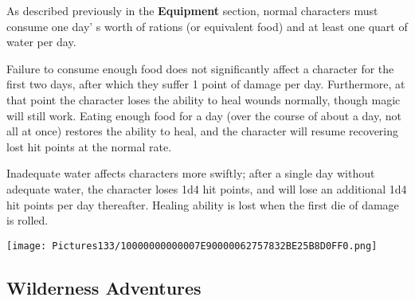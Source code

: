 \documentclass[a4paper,twoside,openany,10pt]{book}
\begin{document}
\begin{multicols}{2}
As described previously in the \textbf{Equipment} section, normal characters must consume one day' s worth of rations (or equivalent food) and at least one quart of water per day.

Failure to consume enough food does not significantly affect a character for the first two days, after which they suffer 1 point of damage per day. Furthermore, at that point the character loses the ability to heal wounds normally, though magic will still work. Eating enough food for a day (over the course of about a day, not all at once) restores the ability to heal, and the character will resume recovering lost hit points at the normal rate.

Inadequate water affects characters more swiftly; after a single day without adequate water, the character loses 1d4 hit points, and will lose an additional 1d4 hit points per day thereafter. Healing ability is lost when the first die of damage is rolled.

\end{multicols}

\vfill

\begin{center}
	\texttt{[image: Pictures133/10000000000007E90000062757832BE25B8D0FF0.png]}
\end{center}

\pagebreak

\subsection{Wilderness Adventures}\label{wilderness-adventures}
\end{document}
